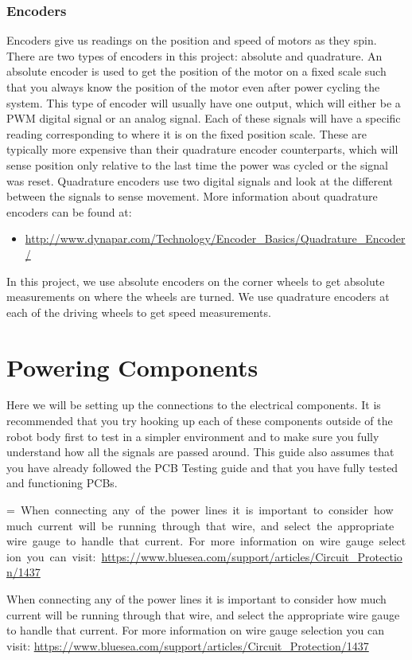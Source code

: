 \documentclass[12pt]{article}
\makeatletter
\newcommand{\mybox}[1]{%
  \setbox0=\hbox{#1}%
  \setlength{\@tempdima}{\dimexpr\wd0+13pt}%
  \begin{tcolorbox}[colframe=mycolor,boxrule=0.5pt,arc=4pt,
      left=6pt,right=6pt,top=6pt,bottom=6pt,boxsep=0pt,width=0.95\textwidth]
    #1
  \end{tcolorbox}
}
\makeatother
\begin{document}
\subsubsection{Encoders}
Encoders give us readings on the position and speed of motors as they spin. There are two types of encoders in this project: absolute and quadrature. An absolute encoder is used to get the position of the motor on a fixed scale such that you always know the position of the motor even after power cycling the system. This type of encoder will usually have one output, which will either be a PWM digital signal or an analog signal. Each of these signals will have a specific reading corresponding to where it is on the fixed position scale. These are typically more expensive than their quadrature encoder counterparts, which will sense position only relative to the last time the power was cycled or the signal was reset. Quadrature encoders use two digital signals and look at the different between the signals to sense movement. More information about quadrature encoders can be found at: 

\begin{itemize}
	\item \href{http://www.dynapar.com/Technology/Encoder_Basics/Quadrature_Encoder/}{http://www.dynapar.com/Technology/Encoder\_Basics/Quadrature\_Encoder/}  
\end{itemize}

\noindent In this project, we use absolute encoders on the corner wheels to get absolute measurements on where the wheels are turned. We use quadrature encoders at each of the driving wheels to get speed measurements.


\section{Powering Components}
Here we will be setting up the connections to the electrical components. It is recommended that you try hooking up each of these components outside of the robot body first to test in a simpler environment and to make sure you fully understand how all the signals are passed around. This guide also assumes that you have already followed the PCB Testing guide and that you have fully tested and functioning PCBs.


\mybox{
When connecting any of the power lines it is important to consider how much current will be running through that wire, and select the appropriate wire gauge to handle that current. For more information on wire gauge selection you can visit: \href{https://www.bluesea.com/support/articles/Circuit_Protection/1437/Part_1\%3A_Choosing_the_Correct_Wire_Size_for_a_DC_Circuit}{https://www.bluesea.com/support/articles/Circuit\_Protection/1437}
}
\end{document}
